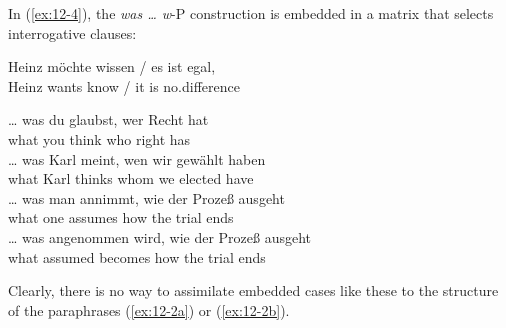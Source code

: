 \documentclass[output=paper]{langsci/langscibook}
\begin{document}
In (\ref{ex:12-4}), the \textit{was \ldots{}  w}-P construction is embedded in a matrix
that selects interrogative clauses:
\begin{exe}
\ex
\label{ex:12-4}
\gll
Heinz möchte wissen / es ist egal,\\
Heinz wants {know} / it is {no.difference}\\
\begin{xlist}
\ex
\label{ex:12-4a}
\gll
\ldots{}  was du glaubst, wer Recht hat \\
 {}  what you think who right has \\
\ex
\label{ex:12-4b}
\gll
\ldots{}  was Karl meint, wen wir gewählt haben \\
 {}  what Karl thinks whom we elected have \\
\ex
\label{ex:12-4c}
\gll
\ldots{}  was man annimmt, wie der Prozeß ausgeht \\
  {}   what one assumes how the trial ends \\
\ex
\label{ex:12-4d}
\gll
\ldots{}  was angenommen wird, wie der Prozeß ausgeht \\
  {}   what assumed becomes how the trial ends \\
\end{xlist}
\end{exe}
\addlines
Clearly, there is no way to assimilate embedded cases like these to
the structure of the paraphrases (\ref{ex:12-2a}) or (\ref{ex:12-2b}).
\end{document}
